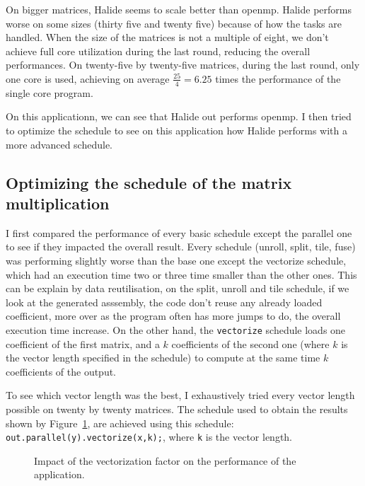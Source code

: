 	On bigger matrices, Halide seems to scale better than \gls{openmp}. Halide performs worse on some sizes (thirty five and twenty five) because of how the tasks are handled.
	When the size of the matrices is not a multiple of eight, we don't achieve full core utilization during the last round, reducing the overall performances. 
	On twenty-five by twenty-five matrices, during the last round, only one core is used, achieving on average $\frac{25}{4} = 6.25$ times the performance of the single core program.
	
	On this applicationn, we can see that Halide out performs \gls{openmp}. I then  tried to optimize the schedule to see on this application how Halide performs with a more advanced schedule.

\subsection{Optimizing the schedule of the matrix multiplication}
	I first compared the performance of every basic schedule except the parallel one to see if they impacted the overall result. Every schedule (unroll, split, tile, fuse) was performing slightly worse than the base one except the vectorize schedule, which had an execution time two or three time smaller than the other ones.
	This can be explain by data reutilisation, on the split, unroll and tile schedule, if we look at the generated asssembly, the code don't reuse any already loaded coefficient, more over as the program often has more jumps to do, the overall execution time increase.
	On the other hand, the \texttt{vectorize} schedule loads one coefficient of the first matrix, and a $k$ coefficients of the second one (where $k$ is the vector length specified in the schedule) to compute at the same time $k$ coefficients of the output.

	To see which vector length was the best, I exhaustively tried every vector length possible on twenty by twenty matrices. The schedule used to obtain the results shown by Figure~\ref{Fig:Vectorization}, are achieved using this schedule: \texttt{out.parallel(y).vectorize(x,k);}, where \texttt{k} is the vector length.

\begin{figure}[H]
	\begin{center}
	\resizebox{10cm}{!}{}
	\label{Fig:Vectorization}
		\caption{Impact of the vectorization factor on the performance of the application.}
	\end{center}
\end{figure}

